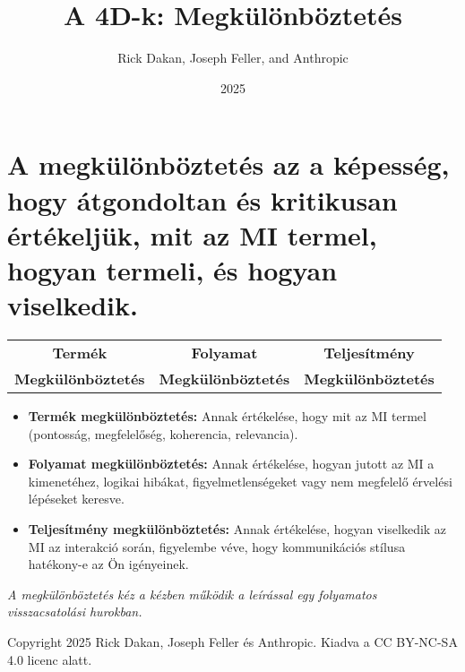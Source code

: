 \documentclass[a4paper, 12pt]{article}
\begin{document}
\title{A 4D-k: Megkülönböztetés}
\author{Rick Dakan, Joseph Feller, and Anthropic}
\date{2025}
\maketitle

\section*{A megkülönböztetés az a képesség, hogy átgondoltan és kritikusan értékeljük, mit az MI termel, hogyan termeli, és hogyan viselkedik.}

\begin{center}
\begin{tabular}{ccc}
\textbf{Termék} & \textbf{Folyamat} & \textbf{Teljesítmény} \\
\textbf{Megkülönböztetés} & \textbf{Megkülönböztetés} & \textbf{Megkülönböztetés} \\
\end{tabular}
\end{center}

\begin{itemize}
    \item \textbf{Termék megkülönböztetés:} Annak értékelése, hogy mit az MI termel (pontosság, megfelelőség, koherencia, relevancia).
    \item \textbf{Folyamat megkülönböztetés:} Annak értékelése, hogyan jutott az MI a kimenetéhez, logikai hibákat, figyelmetlenségeket vagy nem megfelelő érvelési lépéseket keresve.
    \item \textbf{Teljesítmény megkülönböztetés:} Annak értékelése, hogyan viselkedik az MI az interakció során, figyelembe véve, hogy kommunikációs stílusa hatékony-e az Ön igényeinek.
\end{itemize}

\textit{A megkülönböztetés kéz a kézben működik a leírással egy folyamatos visszacsatolási hurokban.}

\vspace{\fill}
\begin{center}
    \small{Copyright 2025 Rick Dakan, Joseph Feller és Anthropic. Kiadva a CC BY-NC-SA 4.0 licenc alatt.}
\end{center}
\end{document}
